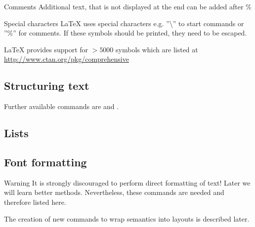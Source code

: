 \begin{frame}
	\begin{block}{Comments}
		Additional text, that is not displayed at the end can be added
		after \%
	\end{block}
\end{frame}

\begin{frame}
	\begin{block}{Special characters}
		{\LaTeX} uses special characters e.g. ''\textbackslash'' to start
		commands or ''\%''
		for comments. If these symbols should be printed, they need to be 
		escaped.
	\end{block}

	\LaTeX{} provides support for $> 5000$ symbols which are listed at 
	\url{http://www.ctan.org/pkg/comprehensive}
\end{frame}

\subsection{Structuring text}
\begin{frame}
\end{frame}
\begin{frame}
	Further available commands are  and .
\end{frame}

\subsection{Lists}
\begin{frame}
\end{frame}
\begin{frame}
\end{frame}
\begin{frame}
\end{frame}

\subsection{Font formatting}
\begin{frame}
	\begin{alertblock}{Warning}
		It is strongly discouraged to perform direct formatting of text! Later
		we will learn better methods. Nevertheless, these commands are needed
		and therefore listed here.
	\end{alertblock}

	The creation of new commands to wrap semantics into layouts is described
	later.
\end{frame}
\begin{frame}
\end{frame}

